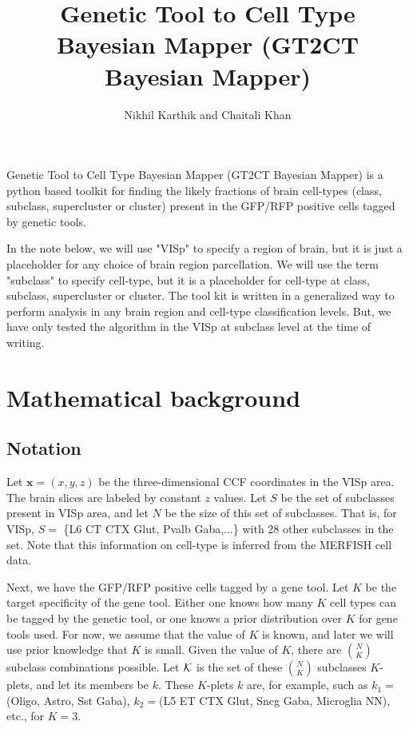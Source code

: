 \documentclass{article}
\title{Genetic Tool to Cell Type Bayesian Mapper (GT2CT Bayesian Mapper)}
\author{Nikhil Karthik and Chaitali Khan}
\begin{document}
\maketitle

Genetic Tool to Cell Type Bayesian Mapper (GT2CT Bayesian Mapper) is a python based toolkit for 
finding the likely fractions of brain cell-types (class, subclass, supercluster or cluster)
present in the GFP/RFP positive cells tagged by genetic tools.

In the note below, we will use "VISp" to specify a region of brain, but it is just a placeholder for any 
choice of brain region parcellation.
We will use the term "subclass" to specify cell-type, but it is a placeholder for
cell-type at class, subclass, supercluster or cluster. The tool kit is written in a generalized way 
to perform analysis in any brain region and cell-type classification levels. But, we 
have only tested the algorithm in the VISp at subclass level at the time of writing.

\section{Mathematical background}

\subsection{Notation}

Let $\mathbf{x}=(x, y, z)$ be the three-dimensional CCF coordinates in the VISp area.  The brain slices 
are labeled by constant $z$ values.  Let $S$ be the set of subclasses present in VISp area, and let 
$N$ be the size of this set of subclasses. That is, for VISp, $S =$ \{L6 CT CTX Glut, Pvalb Gaba,$\ldots$\} 
with 28 other subclasses in the set. Note that this information on cell-type is inferred from the MERFISH cell data.

Next, we have the GFP/RFP positive cells tagged by a gene tool. 
Let $K$ be the target specificity of the gene tool. Either one knows
how many $K$ cell types can be tagged by the genetic tool, or one
knows a prior distribution over $K$ for gene tools used. For now,
we assume that the value of $K$ is known, and later we will use
prior knowledge that $K$ is small. Given the value of $K$, there
are $\binom{N}{K}$ subclass combinations possible.
Let ${\cal K}$ is the set of these $\binom{N}{K}$ subclasses $K$-plets, and
let its members be $k$. These $K$-plets $k$ are, for example,
such as $k_1 =$ (Oligo, Astro, Sst Gaba), $k_2=$(L5 ET CTX Glut, Sncg Gaba, Microglia NN), etc., for 
$K=3$.
\end{document}
